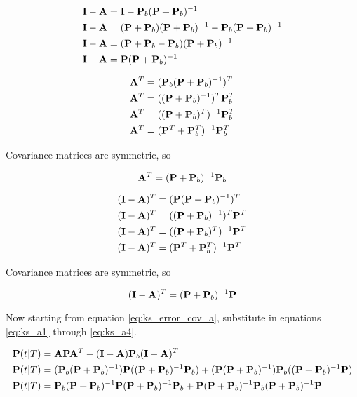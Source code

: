 \begin{align}
  \mathbf{I} - \mathbf{A} &= \mathbf{I} - \mathbf{P}_b(\mathbf{P} + \mathbf{P}_b)^{-1} \nonumber
    \\
  \mathbf{I} - \mathbf{A} &= (\mathbf{P} + \mathbf{P}_b)(\mathbf{P} + \mathbf{P}_b)^{-1} -
    \mathbf{P}_b(\mathbf{P} + \mathbf{P}_b)^{-1} \nonumber \\
  \mathbf{I} - \mathbf{A} &= (\mathbf{P} + \mathbf{P}_b - \mathbf{P}_b)
    (\mathbf{P} + \mathbf{P}_b)^{-1} \nonumber \\
  \mathbf{I} - \mathbf{A} &= \mathbf{P}(\mathbf{P} + \mathbf{P}_b)^{-1} \label{eq:ks_a2}
\end{align}

\begin{align*}
  \mathbf{A}^T &= (\mathbf{P}_b(\mathbf{P} + \mathbf{P}_b)^{-1})^T \\
  \mathbf{A}^T &= ((\mathbf{P} + \mathbf{P}_b)^{-1})^T\mathbf{P}_b^T \\
  \mathbf{A}^T &= ((\mathbf{P} + \mathbf{P}_b)^T)^{-1}\mathbf{P}_b^T \\
  \mathbf{A}^T &= (\mathbf{P}^T + \mathbf{P}_b^T)^{-1}\mathbf{P}_b^T
\end{align*}

Covariance matrices are symmetric, so

\begin{equation}
  \mathbf{A}^T = (\mathbf{P} + \mathbf{P}_b)^{-1}\mathbf{P}_b \label{eq:ks_a3}
\end{equation}

\begin{align*}
  (\mathbf{I} - \mathbf{A})^T &= (\mathbf{P}(\mathbf{P} + \mathbf{P}_b)^{-1})^T \\
  (\mathbf{I} - \mathbf{A})^T &= ((\mathbf{P} + \mathbf{P}_b)^{-1})^T\mathbf{P}^T \\
  (\mathbf{I} - \mathbf{A})^T &= ((\mathbf{P} + \mathbf{P}_b)^T)^{-1}\mathbf{P}^T \\
  (\mathbf{I} - \mathbf{A})^T &= (\mathbf{P}^T + \mathbf{P}_b^T)^{-1}\mathbf{P}^T
\end{align*}

Covariance matrices are symmetric, so

\begin{equation}
  (\mathbf{I} - \mathbf{A})^T = (\mathbf{P} + \mathbf{P}_b)^{-1}\mathbf{P} \label{eq:ks_a4}
\end{equation}

Now starting from equation \eqref{eq:ks_error_cov_a}, substitute in equations
\eqref{eq:ks_a1} through \eqref{eq:ks_a4}.

\begin{align*}
  \mathbf{P}(t|T) &=
    \mathbf{A}\mathbf{P}\mathbf{A}^T + (\mathbf{I} - \mathbf{A})\mathbf{P}_b(\mathbf{I} - \mathbf{A})^T
    \\
  \mathbf{P}(t|T) &=
    (\mathbf{P}_b(\mathbf{P} + \mathbf{P}_b)^{-1})\mathbf{P}
      ((\mathbf{P} + \mathbf{P}_b)^{-1}\mathbf{P}_b) +
    (\mathbf{P}(\mathbf{P} + \mathbf{P}_b)^{-1})\mathbf{P}_b
      ((\mathbf{P} + \mathbf{P}_b)^{-1}\mathbf{P}) \\
  \mathbf{P}(t|T) &=
    \mathbf{P}_b(\mathbf{P} + \mathbf{P}_b)^{-1}\mathbf{P}
    (\mathbf{P} + \mathbf{P}_b)^{-1}\mathbf{P}_b + \mathbf{P}
      (\mathbf{P} + \mathbf{P}_b)^{-1}\mathbf{P}_b
      (\mathbf{P} + \mathbf{P}_b)^{-1}\mathbf{P}
\end{align*}

